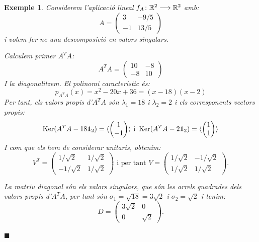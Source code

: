 \documentclass[
  11pt,
]{book}
\numberwithin{dummy}{section}
\theoremstyle{maincolornumbox}
\theoremstyle{blacknumex}
\newtheorem{exampleT}{Exemple}[chapter]
\theoremstyle{blacknumbox}
\theoremstyle{maincolornum}
\newenvironment{example}{\begin{exampleT}}{\hfill{\tiny\ensuremath{\blacksquare}}\end{exampleT}}
\newlength\esp
\begin{document}
\begin{example}

Considerem l'aplicació lineal \(f_A\colon \mathbb{R}^2 \longrightarrow \mathbb{R}^2\) amb:
\[A=\begin{pmatrix}
3 & -9/5 \\ -1 & 13/5
\end{pmatrix}\] i volem fer-ne una descomposició en valors singulars.

Calculem primer \(A^TA\): \[A^T A = \begin{pmatrix}
10 & -8 \\ -8 & 10
\end{pmatrix}\] I la diagonalitzem. El polinomi característic és:
\[p_{A^TA}(x)=x^2 - 20 x + 36 = (x-18)(x-2)\] Per tant, els valors
propis d'\(A^TA\) són \(\lambda_1=18\) i \(\lambda_2=2\) i els corresponents
vectors propis:
\[\operatorname{Ker}(A^TA-18\mathbf{1}_2)=\langle \begin{pmatrix} 1 \\ -1 \end{pmatrix} \rangle \text{ i }
\operatorname{Ker}(A^TA-2\mathbf{1}_2)=\langle \begin{pmatrix} 1 \\ 1 \end{pmatrix} \rangle\]
I com que els hem de considerar unitaris, obtenim: \[V^T=\begin{pmatrix}
1/\sqrt{2} & 1/\sqrt{2} \\ -1/\sqrt{2} & 1/\sqrt{2}
\end{pmatrix}
\text{ i per tant }
V=\begin{pmatrix}
1/\sqrt{2} & -1/\sqrt{2} \\ 1/\sqrt{2} & 1/\sqrt{2}
\end{pmatrix}.\]

La matriu diagonal són els valors singulars, que són les arrels
quadrades dels valors propis d'\(A^TA\), per tant són
\(\sigma_1=\sqrt{18}=3\sqrt{2}\) i \(\sigma_2=\sqrt{2}\) i tenim:
\[D=\begin{pmatrix}
3\sqrt{2} & 0 \\ 0 & \sqrt{2}
\end{pmatrix}.\]


\end{example}
\end{document}
